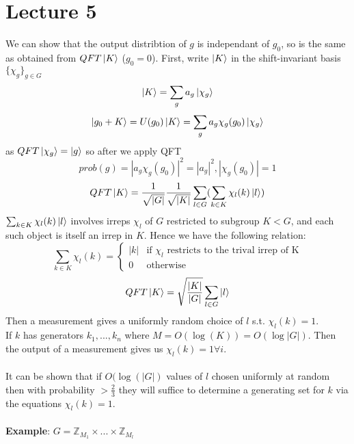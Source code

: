 \documentclass{article}
\begin{document}
\section{Lecture 5}
We can show that the output distribtion of $g$ is independant of $g_0$, so is the same as obtained from $QFT \ket{K}$ ($g_0 = 0$). First, write $\ket{K}$ in the shift-invariant basis $\{ \chi_g \}_{g \in G}$
$$
\ket{K} = \sum_g a_g \ket{\chi_g}
$$
$$
\ket{g_0+K} = U(g_0) \ket{K} = \sum_g a_g \chi_g(g_0) \ket{\chi_g}
$$
as $QFT \ket{\chi_g} = \ket{g}$ so after we apply QFT
$$
prob(g) = |a_g \chi_g(g_0)|^2 = |a_g|^2, |\chi_g(g_0) | = 1
$$
$$
QFT \ket{K} = \frac{1}{\sqrt{|G|}} \frac{1}{\sqrt{|K|}} \sum_{l \in G} ( \sum_{k \in K} \chi_l (k) \ket{l})$$
$\sum_{k \in K} \chi_l (k) \ket{l}$ involves irreps $\chi_l$ of $G$ restricted to subgroup $K < G$, and each such object is itself an irrep in $K$. Hence we have the following relation:
$$
\sum_{k \in K} \chi_l(k) = \begin{cases} |k| & \text{if }\chi_l \text{ restricts to the trival irrep of K}\\ 0 & \text{otherwise} \end{cases}
$$
$$
QFT \ket{K} = \sqrt{\frac{|K|}{|G|}} \sum_{l \in G} \ket{l}
$$
Then a measurement gives a uniformly random choice of $l$ s.t. $\chi_l(k) = 1$.\\
If $k$ has generators $k_1, ..., k_n$ where $M = O(\log(K)) = O(\log |G|)$. Then the output of a measurement gives us $\chi_l(k) = 1 \forall i$.\\\\
It can be shown that if $O(\log(|G|)$ values of $l$ chosen uniformly at random then with probability $>\frac{2}{3}$ they will suffice to determine a generating set for $k$ via the equations $\chi_l(k) = 1$.\\\\
\textbf{Example}: $G = \mathbb{Z}_{M_1} \times ... \times \mathbb{Z}_{M_l}$\\
\end{document}
